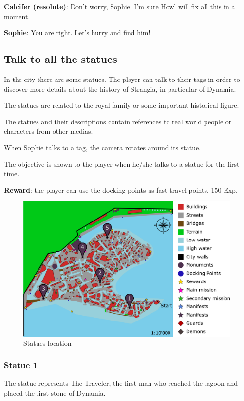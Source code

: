 \textbf{Calcifer (resolute)}: Don't worry, Sophie. I'm sure Howl will fix all this in a moment.

\textbf{Sophie}: You are right. Let's hurry and find him!


\subsection{Talk to all the statues}
In the city there are some statues. The player can talk to their tags in order to discover more details about the history of Strangia, in particular of Dynamia.

The statues are related to the royal family or some important historical figure.

The statues and their descriptions contain references to real world people or characters from other medias.

When Sophie talks to a tag, the camera rotates around its statue.

The objective is shown to the player when he/she talks to a statue for the first time.

\textbf{Reward}: the player can use the docking points as fast travel points, 150 Exp.

\begin{figure}[H]
  \centering
  \includegraphics[width=\textwidth]{../Images/Maps/dynamiaSecondaryMissions_Statues}
  \caption{Statues location}
\end{figure}

\subsubsection*{Statue 1}
The statue represents The Traveler, the first man who reached the lagoon and placed the first stone of Dynamia.

